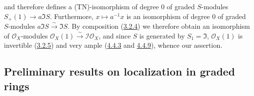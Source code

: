 and therefore defines a (TN)-isomorphism of degree $0$ of graded $S$-modules
$S_+(1)\to a\mathfrak{I}S$. Furthermore, $x\mapsto a^{-1}x$ is an
isomorphism of degree $0$ of graded $S$-modules
$a\mathfrak{I}S\xrightarrow{\sim}\mathfrak{I}S$. By composition
(\hyperref[II.3.2.4]{3.2.4}) we therefore obtain an isomorphism of
$\mathcal{O}_X$-modules
$\mathcal{O}_X(1)\xrightarrow{\sim}\mathcal{I}\mathcal{O}_X$, and since $S$
is generated by $S_1=\mathfrak{I}$, $\mathcal{O}_X(1)$ is invertible
(\hyperref[II.3.2.5]{3.2.5}) and very ample
(\hyperref[II.4.4.3]{4.4.3} and \hyperref[II.4.4.9]{4.4.9}), whence our
assertion.

\subsection{Preliminary results on localization in graded rings}
\label{subsection:II.8.2}

